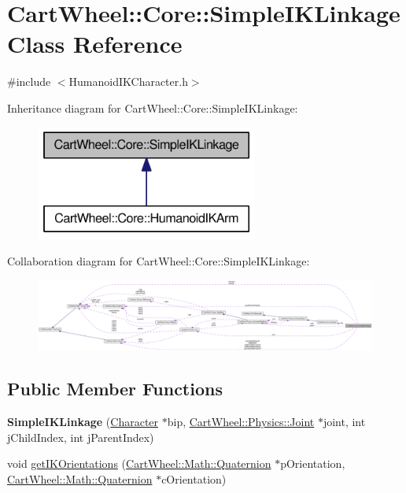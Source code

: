 \hypertarget{classCartWheel_1_1Core_1_1SimpleIKLinkage}{
\section{CartWheel::Core::SimpleIKLinkage Class Reference}
\label{classCartWheel_1_1Core_1_1SimpleIKLinkage}
}


{\ttfamily \#include $<$HumanoidIKCharacter.h$>$}



Inheritance diagram for CartWheel::Core::SimpleIKLinkage:\nopagebreak
\begin{figure}[H]
\begin{center}
\leavevmode
\includegraphics[width=206pt]{classCartWheel_1_1Core_1_1SimpleIKLinkage__inherit__graph}
\end{center}
\end{figure}


Collaboration diagram for CartWheel::Core::SimpleIKLinkage:\nopagebreak
\begin{figure}[H]
\begin{center}
\leavevmode
\includegraphics[width=400pt]{classCartWheel_1_1Core_1_1SimpleIKLinkage__coll__graph}
\end{center}
\end{figure}
\subsection*{Public Member Functions}
\begin{DoxyCompactItemize}
\item 
\hypertarget{classCartWheel_1_1Core_1_1SimpleIKLinkage_a484f834d6a2ac6ab6a541840abf4c64a}{
{\bfseries SimpleIKLinkage} (\hyperlink{classCartWheel_1_1Core_1_1Character}{Character} $\ast$bip, \hyperlink{classCartWheel_1_1Physics_1_1Joint}{CartWheel::Physics::Joint} $\ast$joint, int jChildIndex, int jParentIndex)}
\label{classCartWheel_1_1Core_1_1SimpleIKLinkage_a484f834d6a2ac6ab6a541840abf4c64a}

\item 
void \hyperlink{classCartWheel_1_1Core_1_1SimpleIKLinkage_a356d408ad86434710f311c013b318994}{getIKOrientations} (\hyperlink{classCartWheel_1_1Math_1_1Quaternion}{CartWheel::Math::Quaternion} $\ast$pOrientation, \hyperlink{classCartWheel_1_1Math_1_1Quaternion}{CartWheel::Math::Quaternion} $\ast$cOrientation)
\end{DoxyCompactItemize}
